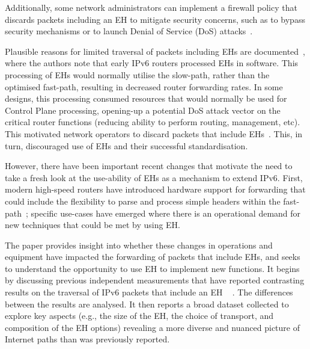 \documentclass[conference]{IEEEtran}
\begin{document}
Additionally, some network administrators can implement a firewall policy that discards packets including an EH to mitigate security concerns, such as to bypass
security mechanisms or to launch Denial of Service (DoS) attacks~\cite{naagas2021deh}.

Plausible reasons for limited traversal of packets including EHs are documented~\cite{ietf-v6ops-hbh-03}, where the authors note that early IPv6 routers
processed EHs in software. This processing of EHs would normally utilise the slow-path, rather than the optimised fast-path, resulting in decreased router forwarding rates. In some designs, this processing consumed resources that would normally be used for Control Plane processing, opening-up a potential DoS attack vector on the critical router functions (reducing ability to perform routing, management, etc). This motivated network operators to discard packets that include EHs~\cite{rfc9098}.  This, in turn,
discouraged use of EHs and their successful standardisation. 

However, there have been important recent changes that motivate the need to take a fresh look at the use-ability of EHs as a mechanism to extend IPv6. First, modern high-speed routers have introduced hardware support for forwarding that could include the flexibility to parse and process simple headers within the fast-path~\cite{cisco-silicon-one}; specific use-cases have emerged where there is an operational demand for new techniques that could be met by using EH.


The paper provides insight into whether these changes in operations and equipment have impacted the forwarding of packets that include EHs, and seeks to understand the opportunity to use EH to implement new functions. It begins by discussing previous independent measurements that have reported contrasting results on the traversal of IPv6 packets that include an EH ~\cite{RFC7872} \cite{apnic} \cite{nalini-iepg114} \cite{james}. The differences between the results are analysed.
It then reports a broad dataset collected to explore key aspects (e.g., the size of the EH, the choice of transport, and composition of the EH options) revealing a more diverse and nuanced picture of Internet paths than was previously reported.

\end{document}
